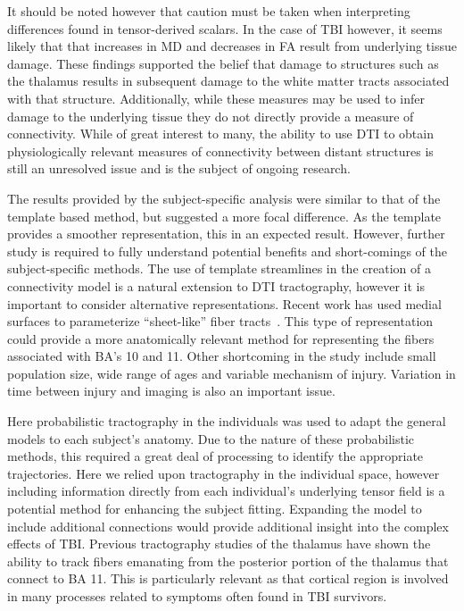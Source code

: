 It should be noted however that caution must be taken when interpreting differences found in tensor-derived scalars. In the case of TBI however, it seems likely that that increases in MD and decreases in FA result from underlying tissue damage. These findings supported the belief that damage to structures such as the thalamus results in subsequent damage to the white matter tracts associated with that structure. Additionally, while these measures may be used to infer damage to the underlying tissue they do not directly provide a measure of connectivity. While of great interest to many, the ability to use DTI to obtain physiologically relevant measures of connectivity between distant structures is still an unresolved issue and is the subject of ongoing research.

The results provided by the subject-specific analysis were similar to that of the template based method, but suggested a more focal difference. As the template provides a smoother representation, this in an expected result.  However, further study is required to fully understand potential benefits and short-comings of the subject-specific methods. The use of template streamlines in the creation of a connectivity model is a natural extension to DTI tractography, however it is important to consider alternative representations. Recent work has used medial surfaces to parameterize ``sheet-like'' fiber tracts~\cite{Yushkevich08}. This type of representation could provide a more anatomically relevant method for representing the fibers associated with BA's 10 and 11. Other shortcoming in the study include small population size, wide range of ages and variable mechanism of injury. Variation in time between injury and imaging is also an important issue.

Here probabilistic tractography in the individuals was used to adapt the general models to each subject's anatomy. Due to the nature of these probabilistic methods, this required a great deal of processing to identify the appropriate trajectories. Here we relied upon tractography in the individual space, however including information directly from each individual's underlying tensor field is a potential method for enhancing the subject fitting. Expanding the model to include additional connections would provide additional insight into the complex effects of TBI. Previous tractography studies of the thalamus have shown the ability to track fibers emanating from the posterior portion of the thalamus that connect to BA 11. This is particularly relevant as that cortical region is involved in many processes related to symptoms often found in TBI survivors.

